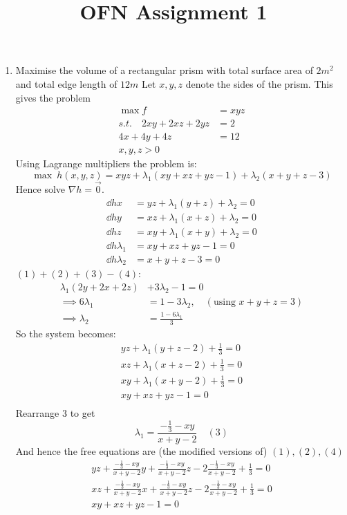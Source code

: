\documentclass{X:/Documents/Coding/Latex/myassignment}
\title{OFN Assignment 1}
\begin{document}
\maketitle

\begin{enumerate}
	\item Maximise the volume of a rectangular prism with total surface area of $2 m^2$ and total edge length of $12 m$
	Let $x,y,z$ denote the sides of the prism. This gives the problem
	\begin{align*}
		\max f &= xyz\\
		s.t. \quad 2xy + 2xz + 2yz &= 2\\
		4x+4y+4z &= 12\\
		x,y,z > 0
	\end{align*}
	Using Lagrange multipliers the problem is:
	\[\max \ h(x,y,z) = xyz + \lambda_1 (xy+xz+yz-1) + \lambda_2(x+y+z-3)\]
	Hence solve $\nabla h = \vec 0$.
	\begin{align}
		\dd hx &= yz + \lambda_1(y + z) + \lambda_2 = 0\\
		\dd hy &= xz + \lambda_1(x + z) + \lambda_2 = 0\\
		\dd hz &= xy + \lambda_1(x + y) + \lambda_2 = 0\\
		\dd h{\lambda_1} &= xy + xz + yz -1 = 0\\
		\dd h{\lambda_2} &= x +y + z -3 = 0 %
	\end{align}
	$(1)+(2)+(3)-(4)$:
	\begin{align*}
		\lambda_1(2y+2x+2z) &+ 3\lambda_2 -1 = 0\\
		\implies 6\lambda_1	&=1-3\lambda_2,\quad   (\text{using } x+y+z =3)\\
		\implies \lambda_2 &= \frac{1-6\lambda_1}{3}
	\end{align*}
	So the system becomes:
	\begin{align*}
	yz + \lambda_1(y + z - 2) + \frac13 = 0\\
	xz + \lambda_1(x + z - 2) + \frac13 = 0\\
	xy + \lambda_1(x + y - 2) + \frac13 = 0\\
	xy + xz + yz - 1 = 0\\
	\end{align*}
	Rearrange $3$ to get
	\[\lambda_1 = \frac{-\frac13 - xy}{x+y-2} \quad (3)\]
	And hence the free equations are (the modified versions of) $(1),(2),(4)$
	\begin{align*}
		yz + \frac{-\frac13 - xy}{x+y-2} y + \frac{-\frac13 - xy}{x+y-2} z - 2 \frac{-\frac13 - xy}{x+y-2} + \frac13 = 0\\
		xz + \frac{-\frac13 - xy}{x+y-2} x + \frac{-\frac13 - xy}{x+y-2} z - 2\frac{-\frac13 - xy}{x+y-2} +\frac13 = 0\\
		xy + xz + yz - 1= 0 
	\end{align*}


\end{enumerate}
\end{document}
